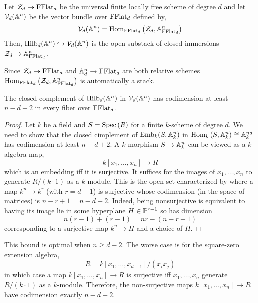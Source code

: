 \documentclass[12pt]{article}
\begin{document}
\newcommand{\cZ}{\mathcal{Z}}
\newcommand{\Rees}{\mathrm{Rees}}

\begin{defn}
Let $\cZ_d \to \FFlat_d$ be the universal finite locally free scheme of degree $d$ and let $\cV_d(\A^n)$ be the vector bundle over $\FFlat_d$ defined by,
\[ \cV_d(\A^n) = \Hom{\FFlat_d}{\cZ_d}{\A^n_{\FFlat_d}} \]
Then, $\Hilb_d(\A^n) \embed \cV_d(\A^n)$ is the open substack of closed immersions $\cZ_d \to \A^n_{\FFlat_d}$. 
\end{defn}

\begin{rmk}
Since $\cZ_d \to \FFlat_d$ and $\A_d^n \to \FFlat_d$ are both relative schemes $\Hom{\FFlat_d}{\cZ_d}{\A^n_{\FFlat_d}}$ is automatically a stack. 
\end{rmk}

\begin{lemma}
The closed complement of $\Hilb_d(\A^n)$ in $\cV_d(\A^n)$ has codimension at least $n-d+2$ in every fiber over $\FFlat_d$. 
\end{lemma}

\begin{proof}
Let $k$ be a field and $S = \Spec{R}$ for a finite $k$-scheme of degree $d$. We need to show that the closed cimplement of $\mathrm{Emb}_k(S, \A^n_k)$ in $\Hom{k}{S}{\A^n_k} \cong \A^{nd}_k$ has codimension at least $n - d + 2$. A $k$-morphism $S \to \A^n_k$ can be viewed as a $k$-algebra map,
\[ k[x_1, \dots, x_n] \to R \]
which is an embedding iff it is surjective. It suffices for the images of $x_1, \dots, x_n$ to generate $R / (k \cdot 1)$ as a $k$-module. This is the open set characterized by where a map $k^n \to k^{r}$ (with $r = d-1$) is surjective whose codimension (in the space of matrices) is $n - r + 1 = n - d + 2$. Indeed, being nonsurjective is equivalent to having its image lie in some hyperplane $H \in \P^{r-1}$ so has dimension \[ n(r-1) + (r-1) = nr - (n - r + 1) \] corresponding to a surjective map $k^n \to H$ and a choice of $H$.
\end{proof}

\begin{rmk}
This bound is optimal when $n \ge d - 2$. The worse case is for the square-zero extension algebra,
\[ R = k[x_1, \dots, x_{d-1}]/(x_i x_j) \]
in which case a map $k[x_1, \dots, x_n] \to R$ is surjective iff $x_1, \dots, x_n$ generate $R / (k \cdot 1)$ as a $k$-module. Therefore, the non-surjective maps $k[x_1, \dots, x_n] \to R$ have codimension exactly $n - d + 2$. 
\end{rmk}
\end{document}
